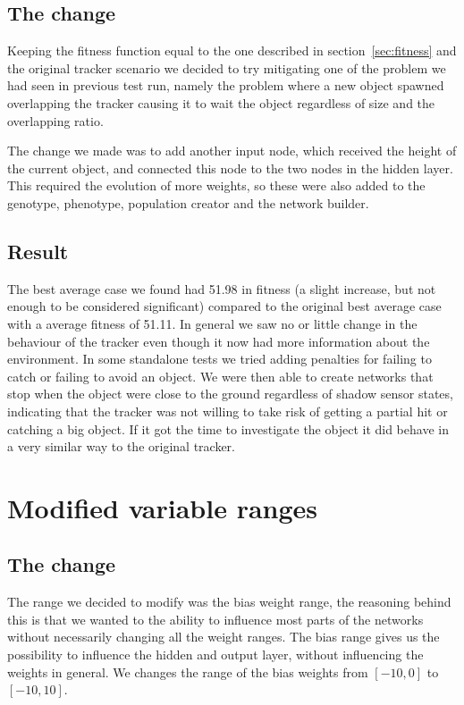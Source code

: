 \documentclass[12pt]{article}
\begin{document}
	\subsection{The change}
		Keeping the fitness function equal to the one described in section~\ref{sec:fitness} and the original tracker scenario we decided to try mitigating one of the problem we had seen in previous test run, namely the problem where a new object spawned overlapping the tracker causing it to wait the object regardless of size and the overlapping ratio. 
		
		The change we made was to add another input node, which received the height of the current object, and connected this node to the two nodes in the hidden layer. This required the evolution of more weights, so these were also added to the genotype, phenotype, population creator and the network builder.
		
	\subsection{Result}
		The best average case we found had 51.98 in fitness (a slight increase, but not enough to be considered significant) compared to the original best average case with a average fitness of 51.11. In general we saw no or little change in the behaviour of the tracker even though it now had more information about the environment. In some standalone tests we tried adding penalties for failing to catch or failing to avoid an object. We were then able to create networks that stop when the object were close to the ground regardless of shadow sensor states, indicating that the tracker was not willing to take risk of getting a partial hit or catching a big object. If it got the time to investigate the object it did behave in a very similar way to the original tracker. 
		
\section{Modified variable ranges}
	\subsection{The change}
		The range we decided to modify was the bias weight range, the reasoning behind this is that we wanted to the ability to influence most parts of the networks without necessarily changing all the weight ranges. The bias range gives us the possibility to influence the hidden and output layer, without influencing the weights in general. We changes the range of the bias weights from $[-10, 0]$ to $[-10, 10]$. 
			
\end{document}
